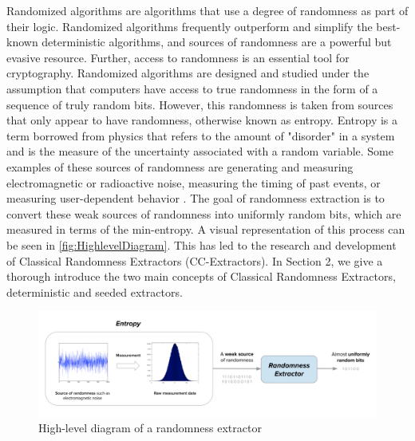 Randomized algorithms are algorithms that use a degree of randomness as part of their logic. Randomized algorithms frequently outperform and simplify the best-known deterministic algorithms, and sources of randomness are a powerful but evasive resource. Further, access to randomness is an essential tool for cryptography. Randomized algorithms are designed and studied under the assumption that computers have access to true randomness in the form of a sequence of truly random bits. However, this randomness is taken from sources that only appear to have randomness, otherwise known as entropy. Entropy is a term borrowed from physics that refers to the amount of "disorder" in a system and is the measure of the uncertainty associated with a random variable. Some examples of these sources of randomness are generating and measuring electromagnetic or radioactive noise, measuring the timing of past events, or measuring user-dependent behavior \cite{Shaltiel2011}. The goal of randomness extraction is to convert these weak sources of randomness into uniformly random bits, which are measured in terms of the min-entropy. A visual representation of this process can be seen in \autoref{fig:HighlevelDiagram}. This has led to the research and development of Classical Randomness Extractors (CC-Extractors). In Section 2, we give a thorough introduce the two main concepts of Classical Randomness Extractors, deterministic and seeded extractors. %

\begin{figure}[!htb]
    \centering
    \includegraphics[scale=0.18]{Images/Highlevel_extractor.png}
    \caption{High-level diagram of a randomness extractor}
    \label{fig:HighlevelDiagram}
\end{figure}

